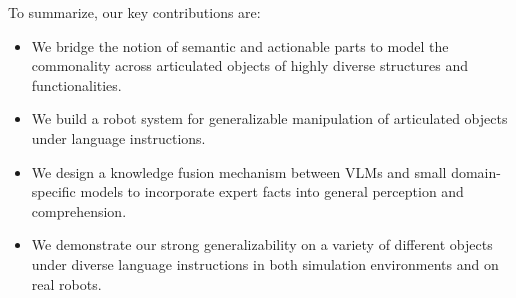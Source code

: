 To summarize, our key contributions are:
\begin{itemize}
    \item We bridge the notion of semantic and actionable parts to model the commonality across articulated objects of highly diverse structures and functionalities.
    \item We build a robot system for generalizable manipulation of articulated objects under language instructions.
    \item We design a knowledge fusion mechanism between VLMs and small domain-specific models to incorporate expert facts into general perception and comprehension.
    \item We demonstrate our strong generalizability on a variety of different objects under diverse language instructions in both simulation environments and on real robots.
\end{itemize}
%